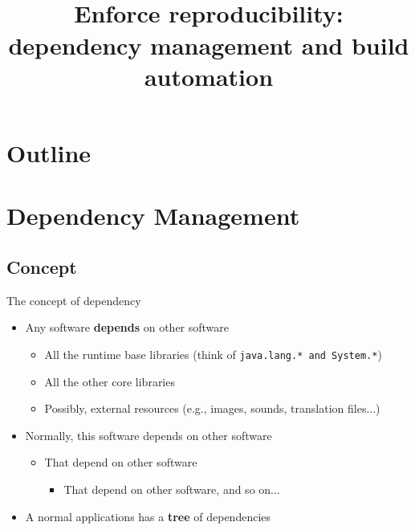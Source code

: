 \documentclass[presentation]{beamer}
\title[03 - Dependency Management]{\small{} \\
\normalsize{Enforce reproducibility: dependency management and build automation}}
\begin{document}


\frame[label=coverpage]{\titlepage}

\section*{Outline}

\frame{\tableofcontents}


\section{Dependency Management}

\subsection{Concept}
\begin{frame}[fragile]{The concept of dependency}
  \begin{itemize}
    \item Any software \textbf{depends} on other software
    \begin{itemize}
      \item All the runtime base libraries (think of \texttt{java.lang.* and System.*})
      \item All the other core libraries
      \item Possibly, external resources (e.g., images, sounds, translation files...)
    \end{itemize}
   \item Normally, this software depends on other software
    \begin{itemize}
      \item That depend on other software
		\begin{itemize}
			\item That depend on other software, and so on...
		\end{itemize}
    \end{itemize}
   \item A normal applications has a \textbf{tree} of dependencies
  \end{itemize}
\end{frame}
\end{document}

